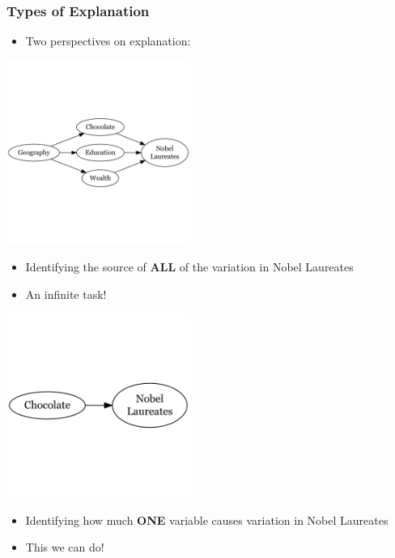 \documentclass[xcolor=x11names,compress]{beamer}\usepackage[]{graphicx}\usepackage[]{xcolor}
\renewcommand{\(}{\begin{columns}}
\renewcommand{\)}{\end{columns}}
\newcommand{\<}[1]{\begin{column}{#1}}
\renewcommand{\>}{\end{column}}
\begin{document}
\begin{frame}
\frametitle{Types of Explanation}
\begin{itemize}
\item Two perspectives on explanation:
\end{itemize}
\begin{multicols}{2}

\includegraphics[width=0.45\textwidth]{graph4.png}
\pause
\begin{itemize}
\item Identifying the source of \textbf{ALL} of the variation in Nobel Laureates
\pause
\item An infinite task!
\end{itemize}
\pause
\columnbreak

\includegraphics[width=0.45\textwidth]{graph5.png}
\pause
\begin{itemize}
\item Identifying how much \textbf{ONE} variable causes variation in Nobel Laureates
\pause
\item This we can do!
\end{itemize}
\end{multicols}
\end{frame}
\end{document}
